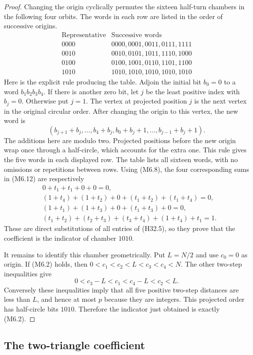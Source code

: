 \documentclass[11pt,oneside]{report}
\theoremstyle{definition}
\numberwithin{equation}{section}
\begin{document}
\begin{proof}
Changing the origin cyclically permutes the sixteen half-turn
chambers in the following four orbits.
The words in each row are listed in the order of successive origins.
\[
\begin{array}{c|l}
 \text{Representative}&\text{Successive words}\\ \hline
 0000&0000,0001,0011,0111,1111\\
 0010&0010,0101,1011,1110,1000\\
 0100&0100,1001,0110,1101,1100\\
 1010&1010,1010,1010,1010,1010
\end{array}
\]
Here is the explicit rule producing the table.
Adjoin the initial bit $b_0=0$ to a word $b_1b_2b_3b_4$.
If there is another zero bit, let $j$ be the least positive index
with $b_j=0$. Otherwise put $j=1$.
The vertex at projected position $j$ is the next vertex in the
original circular order. After changing the origin to this vertex,
the new word is
\[
 (b_{j+1}+b_j,\ldots,b_4+b_j,
       b_0+b_j+1,\ldots,b_{j-1}+b_j+1).
\]
The additions here are modulo two. Projected positions before the
new origin wrap once through a half-circle, which accounts for the
extra one. This rule gives the five words in each displayed row.
The table lists all sixteen words, with no omissions or repetitions
between rows.
Using (M6.8), the four corresponding sums in (M6.12) are respectively
\[
\begin{aligned}
 &0+t_1+t_1+0+0=0,\\
 &(1+t_4)+(1+t_2)+0+(t_1+t_2)+(t_1+t_4)=0,\\
 &(1+t_1)+(1+t_3)+0+(t_1+t_3)+0=0,\\
 &(t_1+t_2)+(t_2+t_3)+(t_3+t_4)+(1+t_4)+t_1=1.
\end{aligned}
\]
These are direct substitutions of all entries of (H32.5), so they
prove that the coefficient is the indicator of chamber $1010$.

It remains to identify this chamber geometrically.
Put $L=N/2$ and use $c_0=0$ as origin.
If (M6.2) holds, then
$0<c_1<c_2<L<c_3<c_4<N$.
The other two-step inequalities give
\[
       0<c_3-L<c_1<c_4-L<c_2<L.
\]
Conversely these inequalities imply that all five positive two-step
distances are less than $L$, and hence at most $p$ because they are
integers. This projected order has half-circle bits $1010$.
Therefore the indicator just obtained is exactly (M6.2).
\end{proof}

\subsection{The two-triangle coefficient}
\end{document}
